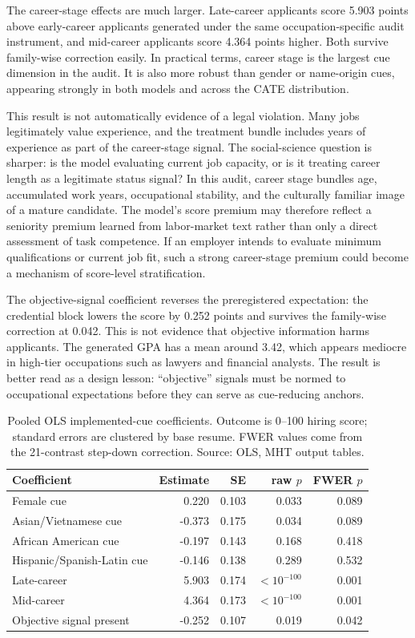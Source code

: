 \documentclass[10pt,twocolumn,letterpaper]{article}
\begin{document}
The career-stage effects are much larger. Late-career applicants score 5.903 points above early-career applicants generated under the same occupation-specific audit instrument, and mid-career applicants score 4.364 points higher. Both survive family-wise correction easily. In practical terms, career stage is the largest cue dimension in the audit. It is also more robust than gender or name-origin cues, appearing strongly in both models and across the CATE distribution.

This result is not automatically evidence of a legal violation. Many jobs legitimately value experience, and the treatment bundle includes years of experience as part of the career-stage signal. The social-science question is sharper: is the model evaluating current job capacity, or is it treating career length as a legitimate status signal? In this audit, career stage bundles age, accumulated work years, occupational stability, and the culturally familiar image of a mature candidate. The model's score premium may therefore reflect a seniority premium learned from labor-market text rather than only a direct assessment of task competence. If an employer intends to evaluate minimum qualifications or current job fit, such a strong career-stage premium could become a mechanism of score-level stratification.

The objective-signal coefficient reverses the preregistered expectation: the credential block lowers the score by 0.252 points and survives the family-wise correction at 0.042. This is not evidence that objective information harms applicants. The generated GPA has a mean around 3.42, which appears mediocre in high-tier occupations such as lawyers and financial analysts. The result is better read as a design lesson: ``objective'' signals must be normed to occupational expectations before they can serve as cue-reducing anchors.

\begin{table}[t]
\centering
\caption{Pooled OLS implemented-cue coefficients. Outcome is 0--100 hiring score; standard errors are clustered by base resume. FWER values come from the 21-contrast step-down correction. Source: OLS, MHT output tables.}
\label{tab:ols}
\begin{tabular}{lrrrr}
\toprule
Coefficient & Estimate & SE & raw $p$ & FWER $p$ \\
\midrule
Female cue & 0.220 & 0.103 & 0.033 & 0.089 \\
Asian/Vietnamese cue & -0.373 & 0.175 & 0.034 & 0.089 \\
African American cue & -0.197 & 0.143 & 0.168 & 0.418 \\
Hispanic/Spanish-Latin cue & -0.146 & 0.138 & 0.289 & 0.532 \\
Late-career & 5.903 & 0.174 & $<10^{-100}$ & 0.001 \\
Mid-career & 4.364 & 0.173 & $<10^{-100}$ & 0.001 \\
Objective signal present & -0.252 & 0.107 & 0.019 & 0.042 \\
\bottomrule
\end{tabular}
\end{table}
\end{document}
